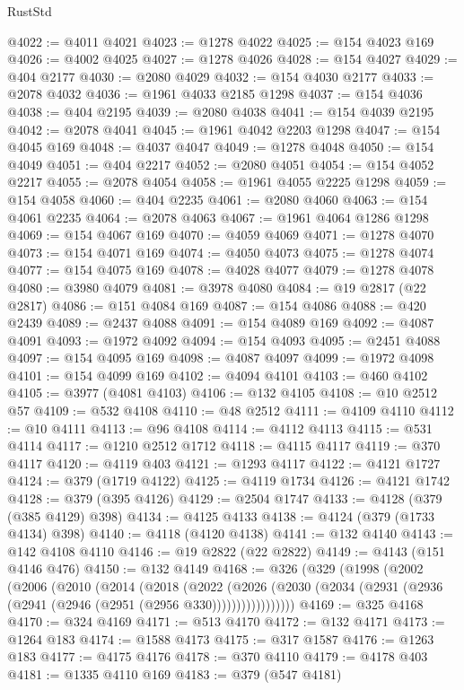 \begin{lexlean}{RustStd}
\begin{coremodule}
@4022 := @4011 @4021
@4023 := @1278 @4022
@4025 := @154 @4023 @169
@4026 := @4002 @4025
@4027 := @1278 @4026
@4028 := @154 @4027
@4029 := @404 @2177
@4030 := @2080 @4029
@4032 := @154 @4030 @2177
@4033 := @2078 @4032
@4036 := @1961 @4033 @2185 @1298
@4037 := @154 @4036
@4038 := @404 @2195
@4039 := @2080 @4038
@4041 := @154 @4039 @2195
@4042 := @2078 @4041
@4045 := @1961 @4042 @2203 @1298
@4047 := @154 @4045 @169
@4048 := @4037 @4047
@4049 := @1278 @4048
@4050 := @154 @4049
@4051 := @404 @2217
@4052 := @2080 @4051
@4054 := @154 @4052 @2217
@4055 := @2078 @4054
@4058 := @1961 @4055 @2225 @1298
@4059 := @154 @4058
@4060 := @404 @2235
@4061 := @2080 @4060
@4063 := @154 @4061 @2235
@4064 := @2078 @4063
@4067 := @1961 @4064 @1286 @1298
@4069 := @154 @4067 @169
@4070 := @4059 @4069
@4071 := @1278 @4070
@4073 := @154 @4071 @169
@4074 := @4050 @4073
@4075 := @1278 @4074
@4077 := @154 @4075 @169
@4078 := @4028 @4077
@4079 := @1278 @4078
@4080 := @3980 @4079
@4081 := @3978 @4080
@4084 := @19 @2817 (@22 @2817)
@4086 := @151 @4084 @169
@4087 := @154 @4086
@4088 := @420 @2439
@4089 := @2437 @4088
@4091 := @154 @4089 @169
@4092 := @4087 @4091
@4093 := @1972 @4092
@4094 := @154 @4093
@4095 := @2451 @4088
@4097 := @154 @4095 @169
@4098 := @4087 @4097
@4099 := @1972 @4098
@4101 := @154 @4099 @169
@4102 := @4094 @4101
@4103 := @460 @4102
@4105 := @3977 (@4081 @4103)
@4106 := @132 @4105
@4108 := @10 @2512 @57
@4109 := @532 @4108
@4110 := @48 @2512
@4111 := @4109 @4110
@4112 := @10 @4111
@4113 := @96 @4108
@4114 := @4112 @4113
@4115 := @531 @4114
@4117 := @1210 @2512 @1712
@4118 := @4115 @4117
@4119 := @370 @4117
@4120 := @4119 @403
@4121 := @1293 @4117
@4122 := @4121 @1727
@4124 := @379 (@1719 @4122)
@4125 := @4119 @1734
@4126 := @4121 @1742
@4128 := @379 (@395 @4126)
@4129 := @2504 @1747
@4133 := @4128 (@379 (@385 @4129) @398)
@4134 := @4125 @4133
@4138 := @4124 (@379 (@1733 @4134) @398)
@4140 := @4118 (@4120 @4138)
@4141 := @132 @4140
@4143 := @142 @4108 @4110
@4146 := @19 @2822 (@22 @2822)
@4149 := @4143 (@151 @4146 @476)
@4150 := @132 @4149
@4168 := @326
    (@329
      (@1998
        (@2002
          (@2006
            (@2010
              (@2014
                (@2018
                  (@2022
                    (@2026
                      (@2030 (@2034 (@2931 (@2936 (@2941 (@2946 (@2951 (@2956 @330)))))))))))))))))
@4169 := @325 @4168
@4170 := @324 @4169
@4171 := @513 @4170
@4172 := @132 @4171
@4173 := @1264 @183
@4174 := @1588 @4173
@4175 := @317 @1587
@4176 := @1263 @183
@4177 := @4175 @4176
@4178 := @370 @4110
@4179 := @4178 @403
@4181 := @1335 @4110 @169
@4183 := @379 (@547 @4181)

\end{coremodule}
\end{lexlean}
